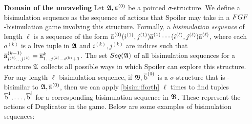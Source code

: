 \noindent \textbf{Domain of the unraveling}
Let ${\mathfrak{A}}, \overline{\mathrm{a}}^{(0)}$ be a pointed $\sigma$-structure.
We define a bisimulation sequence as the sequence of actions that Spoiler may take in a $\FGF$-bisimulation game involving this structure.
Formally, a \emph{bisimulation sequence} of length $\ell$ is a sequence of the form $\overline{\mathrm{a}}^{(0)}(i^{(1)}, j^{(1)})\overline{\mathrm{a}}^{(1)}\cdots(i^{(\ell)}, j^{(\ell)})\overline{\mathrm{a}}^{(\ell)}$, where each $a^{(k)}$ is a live tuple in ${\mathfrak{A}}$ and $i^{(k)}, j^{(k)}$ are indices such that $\overline{\mathrm{a}}_{i^{(k)}\ldots j^{(k)}}^{(k-1)} = \overline{\mathrm{a}}_{1\ldots j^{(k)}-i^{(k)}+1}^{k}$.
The set $\Seq{A}$ of all bisimulation sequences for a structure ${\mathfrak{A}}$ collects all possible ways in which Spoiler can explore this structure.
For any length $\ell$ bisimulation sequence, if ${\mathfrak{B}}, \overline{\mathrm{b}}^{(0)}$ is a $\sigma$-structure that is \FGF-bisimilar to ${\mathfrak{A}}, \overline{\mathrm{a}}^{(0)}$, then we can apply \ref{bisim:fforth} $\ell$ times to find tuples $\overline{\mathrm{b}}^{1}, \ldots, \overline{\mathrm{b}}^{\ell}$ for a corresponding bisimulation sequence in ${\mathfrak{B}}$.
These represent the actions of Duplicator in the game.
Below are some examples of bisimulation sequences:
